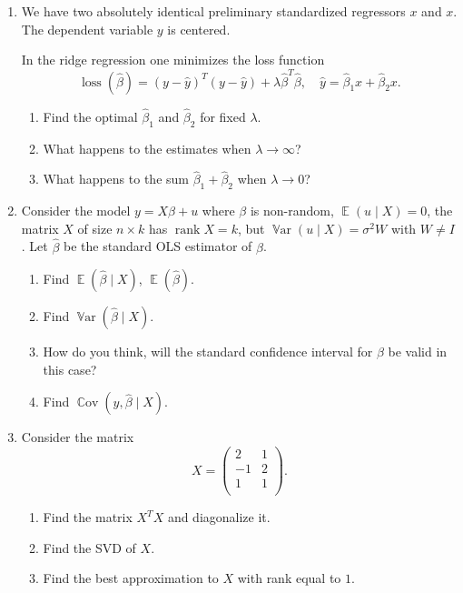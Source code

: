 \documentclass[12pt]{article}
\DeclareMathOperator{\Cov}{\mathbb{C}ov}
\DeclareMathOperator{\Var}{\mathbb{V}ar}
\DeclareMathOperator{\E}{\mathbb{E}}
\newcommand{\hb}{\hat{\beta}}
\DeclareMathOperator{\loss}{loss}
\DeclareMathOperator{\rank}{rank}
\begin{document}

\begin{enumerate}
    \item We have two absolutely identical preliminary standardized regressors $x$ and $x$. 
    The dependent variable $y$ is centered.
    
    In the ridge regression one minimizes the loss function
    \[
    \loss(\hb) = (y - \hat y)^T (y - \hat y) + \lambda \hb^T \hb, \quad \hat y = \hb_1 x + \hb_2 x.
    \]
    \begin{enumerate}
      \item Find the optimal $\hb_1$ and $\hb_2$ for fixed $\lambda$.
      \item What happens to the estimates when $\lambda\to\infty$?
      \item What happens to the sum $\hb_1 + \hb_2$ when $\lambda\to 0$?
    \end{enumerate}
    
    \item Consider the model $y = X\beta + u$ where $\beta$ is non-random,
    $\E(u \mid X ) = 0$, the matrix $X$ of size $n\times k$ has $\rank X = k$, 
    but $\Var(u \mid X) = \sigma^2 W$ with $W \neq I$.
    Let $\hb$ be the standard OLS estimator of $\beta$.

    \begin{enumerate}
        \item Find $\E(\hb \mid X)$, $\E(\hb)$.
        \item Find $\Var(\hb \mid X)$.
        \item How do you think, will the standard confidence interval for $\beta$ be valid in this case?
        \item Find $\Cov(y, \hb \mid X)$.
    \end{enumerate}

    
    \item %
    Consider the matrix 
    \[
    X = \begin{pmatrix}
        2 & 1 \\
        -1 & 2 \\
        1 & 1 \\
    \end{pmatrix}.
    \]
    \begin{enumerate}
        \item Find the matrix $X^T X$ and diagonalize it.
        \item Find the SVD of $X$.
        \item Find the best approximation to $X$ with rank equal to $1$. 
    \end{enumerate}


\end{enumerate}
\end{document}
